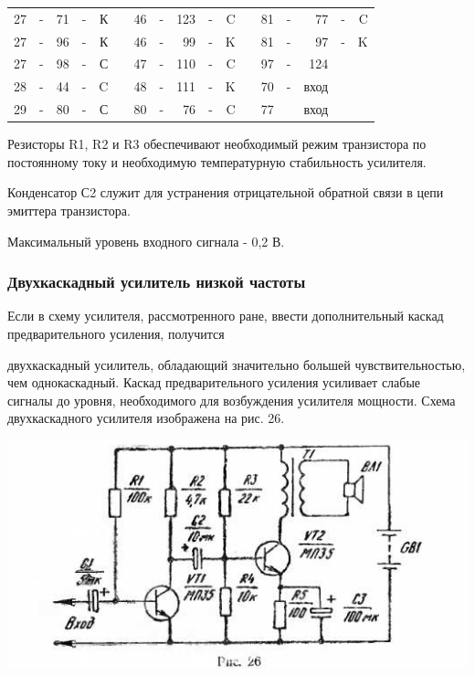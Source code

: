 \documentclass[12pt]{article}
\begin{document}
\hrulefill

\begin{tabular}{r c r c r p{2cm} r c r c r p{2cm} r c r c r}
27 & - & 71 & - & К &     & 46 & - & 123 & - & C &    &  81 & - &  77  & - & C\\
27 & - & 96 & - & К &     & 46 & - &  99 & - & K &    &  81 & - &  97  & - & K\\
27 & - & 98 & - & С &     & 47 & - & 110 & - & C &    &  97 & - & 124  &   & \\
28 & - & 44 & - & C &     & 48 & - & 111 & - & K &    &  70 & - & вход &   & \\
29 & - & 80 & - & С &     & 80 & - &  76 & - & C &    &  77 &   & вход &   & \\
\end{tabular}

\hrulefill

Резисторы R1, R2 и R3 обеспечивают необходимый режим транзистора по постоянному току и необходимую температурную стабильность усилителя.

Конденсатор С2 служит для устранения отрицательной обратной связи в цепи эмиттера транзистора.

Максимальный уровень входного сигнала - 0,2 В.

\subsubsection{Двухкаскадный усилитель низкой частоты}
Если в схему усилителя, рассмотренного ране, ввести дополнительный каскад предварительного усиления, получится

\newpage
двухкаскадный усилитель, обладающий значительно большей чувствительностью, чем однокаскадный. Каскад предварительного усиления усиливает слабые сигналы до уровня, необходимого для возбуждения усилителя мощности. Схема двухкаскадного усилителя изображена на рис. 26.

\includegraphics[width=\textwidth]{ekon3_023_1}
\end{document}
